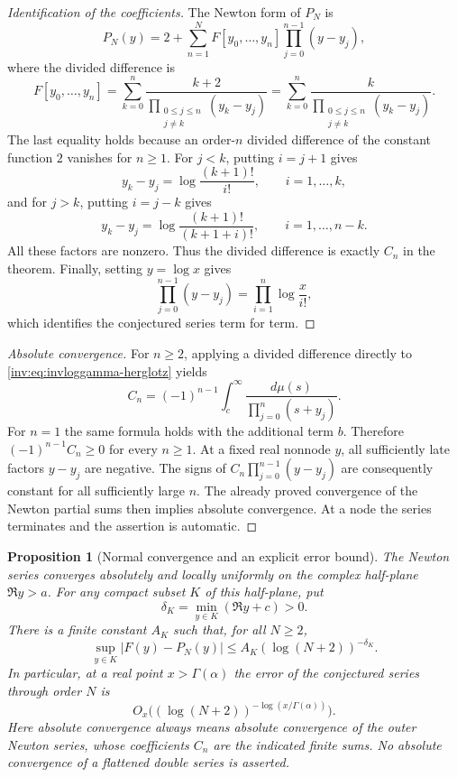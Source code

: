 \documentclass[11pt,a4paper]{article}
\newtheorem{proposition}[theorem]{Proposition}
\theoremstyle{definition}
\theoremstyle{remark}
\numberwithin{equation}{section}
\begin{document}
\begin{proof}[Identification of the coefficients]
The Newton form of $P_N$ is
\[
 P_N(y)=2+\sum_{n=1}^{N}
 F[y_0,\ldots,y_n]\prod_{j=0}^{n-1}(y-y_j),
\]
where the divided difference is
\[
 F[y_0,\ldots,y_n]
 =\sum_{k=0}^{n}
   \frac{k+2}{\prod_{\substack{0\leq j\leq n\\j\ne k}}(y_k-y_j)}
 =\sum_{k=0}^{n}
   \frac{k}{\prod_{\substack{0\leq j\leq n\\j\ne k}}(y_k-y_j)}.
\]
The last equality holds because an order-$n$ divided difference of
the constant function $2$ vanishes for $n\geq1$.
For $j<k$, putting $i=j+1$ gives
\[
 y_k-y_j=\log\frac{(k+1)!}{i!},\qquad i=1,\ldots,k,
\]
and for $j>k$, putting $i=j-k$ gives
\[
 y_k-y_j=\log\frac{(k+1)!}{(k+1+i)!},
 \qquad i=1,\ldots,n-k.
\]
All these factors are nonzero. Thus the divided difference is exactly
$C_n$ in the theorem. Finally, setting $y=\log x$ gives
\[
 \prod_{j=0}^{n-1}(y-y_j)
 =\prod_{i=1}^{n}\log\frac{x}{i!},
\]
which identifies the conjectured series term for term.
\end{proof}

\begin{proof}[Absolute convergence]
For $n\geq2$, applying a divided difference directly to
\eqref{inv:eq:invloggamma-herglotz} yields
\[
 C_n=(-1)^{n-1}
       \int_c^{\infty}\frac{d\mu(s)}
                         {\prod_{j=0}^{n}(s+y_j)}.
\]
For $n=1$ the same formula holds with the additional term $b$.
Therefore $(-1)^{n-1}C_n\geq0$ for every $n\geq1$.
At a fixed real nonnode $y$, all sufficiently late factors
$y-y_j$ are negative. The signs of
$C_n\prod_{j=0}^{n-1}(y-y_j)$ are consequently constant for all
sufficiently large $n$. The already proved convergence of the Newton
partial sums then implies absolute convergence. At a node the series
terminates and the assertion is automatic.
\end{proof}

\begin{proposition}[Normal convergence and an explicit error bound]
The Newton series converges absolutely and locally uniformly on the
complex half-plane $\Re y>a$. For any compact subset $K$ of this
half-plane, put
\[
 \delta_K=\min_{y\in K}(\Re y+c)>0.
\]
There is a finite constant $A_K$ such that, for all $N\geq2$,
\[
 \sup_{y\in K}|F(y)-P_N(y)|
 \leq A_K(\log(N+2))^{-\delta_K}.
\]
In particular, at a real point $x>\Gamma(\alpha)$ the error of the
conjectured series through order $N$ is
\[
 O_x\bigl((\log(N+2))^{-\log(x/\Gamma(\alpha))}\bigr).
\]
Here absolute convergence always means absolute convergence of the
outer Newton series, whose coefficients $C_n$ are the indicated finite
sums. No absolute convergence of a flattened double series is asserted.
\end{proposition}
\end{document}
